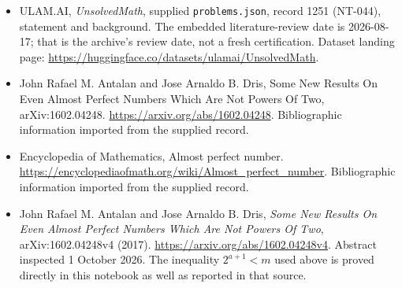 \documentclass[11pt,a4paper]{article}
\begin{document}
{\small

\begin{itemize}

\item[\hypertarget{source:1251:1}{S1}] ULAM.AI, \emph{UnsolvedMath}, supplied \texttt{problems.json}, record 1251 (NT-044), statement and background. The embedded literature-review date is 2026-08-17; that is the archive’s review date, not a fresh certification. Dataset landing page: \url{https://huggingface.co/datasets/ulamai/UnsolvedMath}.

\item[\hypertarget{source:1251:2}{S2}] John Rafael M. Antalan and Jose Arnaldo B. Dris, Some New Results On Even Almost Perfect Numbers Which Are Not Powers Of Two, arXiv:1602.04248. \url{https://arxiv.org/abs/1602.04248}. Bibliographic information imported from the supplied record.

\item[\hypertarget{source:1251:3}{S3}] Encyclopedia of Mathematics, Almost perfect number. \url{https://encyclopediaofmath.org/wiki/Almost_perfect_number}. Bibliographic information imported from the supplied record.


\item[E1] John Rafael M. Antalan and Jose Arnaldo B. Dris,
\emph{Some New Results On Even Almost Perfect Numbers Which Are Not
Powers Of Two}, arXiv:1602.04248v4 (2017).
\url{https://arxiv.org/abs/1602.04248v4}. Abstract inspected
1 October 2026. The inequality $2^{a+1}<m$ used above is proved
directly in this notebook as well as reported in that source.

\end{itemize}

}

\label{end:1251}
\end{document}
